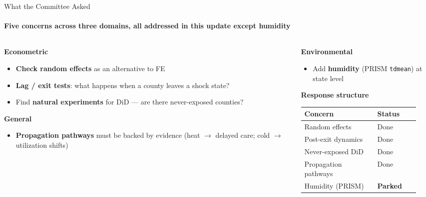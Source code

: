 \documentclass[aspectratio=169,11pt]{beamer}
\newcommand{\emphcolor}[1]{{\color{WarmOrange}\textbf{#1}}}
\newcommand{\tealtext}[1]{{\color{Teal}#1}}
\begin{document}
\begin{frame}{What the Committee Asked}
  \framesubtitle{Five concerns across three domains, all addressed in this update except humidity}
  \begin{columns}[T]
    \begin{column}{0.47\textwidth}
      \textbf{\tealtext{Econometric}}
      \begin{itemize}\itemsep0.15em
        \item \emphcolor{Check random effects} as an alternative to FE
        \item \emphcolor{Lag / exit tests}: what happens when a county leaves a shock state?
        \item Find \emphcolor{natural experiments} for DiD --- are there never-exposed counties?
      \end{itemize}
      \vspace{0.4em}
      \textbf{\tealtext{General}}
      \begin{itemize}\itemsep0.15em
        \item \emphcolor{Propagation pathways} must be backed by evidence (heat \(\to\) delayed care; cold \(\to\) utilization shifts)
      \end{itemize}
    \end{column}
    \begin{column}{0.47\textwidth}
      \textbf{\tealtext{Environmental}}
      \begin{itemize}\itemsep0.15em
        \item Add \emphcolor{humidity} (PRISM \texttt{tdmean}) at state level
      \end{itemize}
      \vspace{0.5em}
      \textbf{\tealtext{Response structure}}\\[0.2em]
      \footnotesize
      \begin{tabular}{@{}>{\raggedright\arraybackslash}p{0.55\linewidth}>{\raggedright\arraybackslash}p{0.32\linewidth}@{}}
        \toprule
        Concern & Status \\
        \midrule
        Random effects & Done \\
        Post-exit dynamics & Done \\
        Never-exposed DiD & Done \\
        Propagation pathways & Done \\
        Humidity (PRISM) & \emphcolor{Parked} \\
        \bottomrule
      \end{tabular}
    \end{column}
  \end{columns}
\end{frame}
\end{document}

